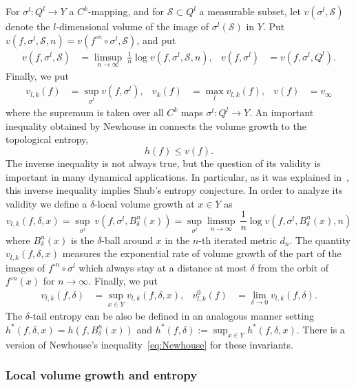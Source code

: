 \documentclass[reqno]{amsart}
\renewcommand\~[1]{\widetilde{#1}}
\def\cS{{\mathcal S}} \def\cSc{{\mathcal S \mathcal C}}
\begin{document}
For $\sigma^l:Q^l\to Y$ a $C^k$-mapping, and for $\cS\subset Q^l$ a
measurable subset, let $v(\sigma^l,\cS)$ denote the $l$-dimensional
volume of the image of $\sigma^l(\cS)$ in $Y$. Put
$v(f,\sigma^l,\cS,n)=v(f^{\circ n}\circ \sigma^l,\cS)$, and put
\begin{align}\label{eq:vol.growth}
  v(f,\sigma^l,\cS)&= \limsup_{n\to \infty} \ \frac{1}{n} \log v(f,\sigma^l,\cS,n), &
  v(f,\sigma^l)&=v(f,\sigma^l, Q^l).
\end{align}
Finally, we put
\begin{align}
  v_{l,k}(f)&=\sup_{\sigma^l}v(f,\sigma^l), & v_{k}(f)&=\max_{l} v_{l,k}(f), & v(f)&=v_\infty
\end{align}
where the supremum is taken over all $C^k$ maps
$\sigma^l:Q^l\to Y$. An important inequality obtained by Newhouse in
\cite{newhouse:entropy-volume} connects the volume growth to the
topological entropy,
\begin{equation}\label{eq:Newhouse}
  h(f)\le v(f).
\end{equation}
The inverse inequality is not always true, but the question of its
validity is important in many dynamical applications. In particular,
as it was explained in~, this inverse
inequality implies Shub's entropy conjecture. In order to analyze its
validity we define a $\delta$-local volume growth at $x\in Y$ as
\begin{equation}
  v_{l,k}(f,\delta,x)=\sup_{\sigma^l} \ v(f,\sigma^l,B^n_{\delta}(x))
  = \sup_{\sigma^l} \limsup_{n\to \infty} \ \frac{1}{n} \log v(f,\sigma^l,B^n_{\delta}(x),n)
\end{equation}
where $B^n_{\delta}(x)$ is the $\delta$-ball around $x$ in the $n$-th
iterated metric $d_n$. The quantity $v_{l,k}(f,\delta,x)$ measures the
exponential rate of volume growth of the part of the images of
$f^{\circ n}\circ \sigma^l$ which always stay at a distance at most
$\delta$ from the orbit of $f^{\circ n}(x)$ for $n\to\infty$. Finally,
we put
\begin{align}
  v_{l,k}(f,\delta)&=\sup_{x\in Y} v_{l,k}(f,\delta,x), & v^0_{l,k}(f)&=\lim_{\delta\to 0} v_{l,k}(f,\delta).
\end{align}
The $\delta$-tail entropy can be also be defined in an analogous
manner setting $h^*(f,\delta,x)=h(f,B^n_{\delta}(x))$ and
$h^*(f,\delta):=\sup_{x\in Y} h^*(f,\delta,x)$. There is a version of
Newhouse's inequality~\eqref{eq:Newhouse} for these invariants.

\subsubsection{Local volume growth and entropy}
\end{document}
